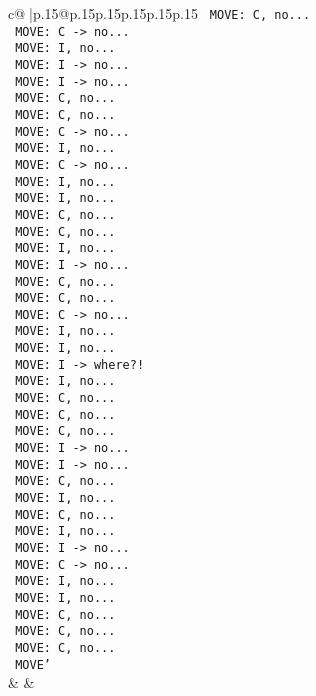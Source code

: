 \documentclass{article}
\begin{document}
{\begin{supertabular}{c@{$\;$}|p{.15\linewidth}@{}p{.15\linewidth}p{.15\linewidth}p{.15\linewidth}p{.15\linewidth}p{.15\linewidth}}
{{{\texttt{ MOVE: C, no...} \\
\texttt{ MOVE: C {-}> no...} \\
\texttt{ MOVE: I, no...} \\
\texttt{ MOVE: I {-}> no...} \\
\texttt{ MOVE: I {-}> no...} \\
\texttt{ MOVE: C, no...} \\
\texttt{ MOVE: C, no...} \\
\texttt{ MOVE: C {-}> no...} \\
\texttt{ MOVE: I, no...} \\
\texttt{ MOVE: C {-}> no...} \\
\texttt{ MOVE: I, no...} \\
\texttt{ MOVE: I, no...} \\
\texttt{ MOVE: C, no...} \\
\texttt{ MOVE: C, no...} \\
\texttt{ MOVE: I, no...} \\
\texttt{ MOVE: I {-}> no...} \\
\texttt{ MOVE: C, no...} \\
\texttt{ MOVE: C, no...} \\
\texttt{ MOVE: C {-}> no...} \\
\texttt{ MOVE: I, no...} \\
\texttt{ MOVE: I, no...} \\
\texttt{ MOVE: I {-}> where?!} \\
\texttt{ MOVE: I, no...} \\
\texttt{ MOVE: C, no...} \\
\texttt{ MOVE: C, no...} \\
\texttt{ MOVE: C, no...} \\
\texttt{ MOVE: I {-}> no...} \\
\texttt{ MOVE: I {-}> no...} \\
\texttt{ MOVE: C, no...} \\
\texttt{ MOVE: I, no...} \\
\texttt{ MOVE: C, no...} \\
\texttt{ MOVE: I, no...} \\
\texttt{ MOVE: I {-}> no...} \\
\texttt{ MOVE: C {-}> no...} \\
\texttt{ MOVE: I, no...} \\
\texttt{ MOVE: I, no...} \\
\texttt{ MOVE: C, no...} \\
\texttt{ MOVE: C, no...} \\
\texttt{ MOVE: C, no...} \\
\texttt{ MOVE'} \\
            }
        }
    }
    & & \\ \\


\end{supertabular}}
\end{document}

